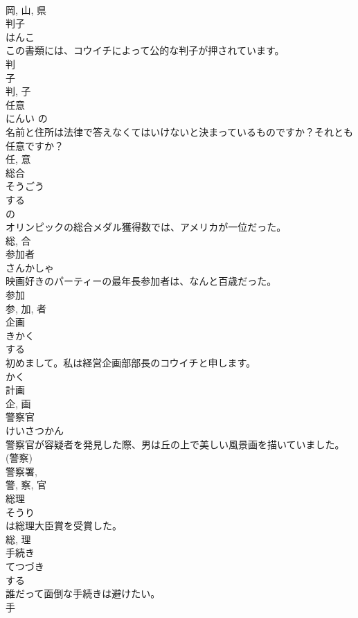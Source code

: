 \documentclass[8pt]{extreport}
\begin{document}
\begin{CJK}{UTF8}{min}
\\	岡, 山, 県	
\\	判子	
\\	はんこ	
\\	この書類には、コウイチによって公的な判子が押されています。	
\\	判 
\\	子 
\\	判, 子	
\\	任意	
\\	にんい	の 
\\	名前と住所は法律で答えなくてはいけないと決まっているものですか？それとも任意ですか？	
\\	任, 意	
\\	総合	
\\	そうごう	
\\	する 
\\	の 
\\	オリンピックの総合メダル獲得数では、アメリカが一位だった。	
\\	総, 合	
\\	参加者	
\\	さんかしゃ	
\\	映画好きのパーティーの最年長参加者は、なんと百歳だった。	
\\	参加 
\\	参, 加, 者	
\\	企画	
\\	きかく	
\\	する 
\\	初めまして。私は経営企画部部長のコウイチと申します。	
\\	かく 
\\	計画 
\\	企, 画	
\\	警察官	
\\	けいさつかん	
\\	警察官が容疑者を発見した際、男は丘の上で美しい風景画を描いていました。	
\\	(警察) 
\\	警察署, 
\\	警, 察, 官	
\\	総理	
\\	そうり	
\\	は総理大臣賞を受賞した。	
\\	総, 理	
\\	手続き	
\\	てつづき	
\\	する 
\\	誰だって面倒な手続きは避けたい。	
\\	手 

\end{CJK}
\end{document}

